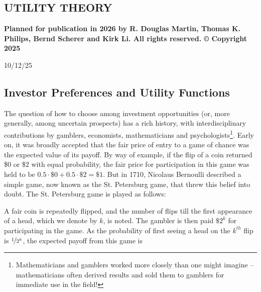 \documentclass[graybox,envcountchap,sectrefs]{svmono}\usepackage[]{graphicx}\usepackage[]{xcolor}
\begin{document}
\begin{appendices}


\setcounter{chapter}{2} 

\chapter{UTILITY THEORY\label{chap:AppendixC}}

\vspace{0.3in}

\textbf{Planned for publication in 2026 by R. Douglas Martin, Thomas
K. Philips, Bernd Scherer and Kirk Li. All rights reserved. © Copyright
2025}

\vspace{0.3in}

\begin{center}
10/12/25
\par\end{center}

\tocchpnum=30pt 
\tocsecnum=33pt 
\tocsubsecnum=40pt 
\tocsubsubsecnum=48pt 
\tocparanum=55pt 
\tocsubparanum=63pt
\calctocindent

\tableofcontents{}\newpage{}

\section{Investor Preferences and Utility Functions \label{sec: investorPreferencesConcaveUtilityFncs}}

The question of how to choose among investment opportunities (or,
more generally, among uncertain prospects) has a rich history, with
interdisciplinary contributions by gamblers, economists, mathematicians
and psychologists\footnote{Mathematicians and gamblers worked more closely than one might imagine
-- mathematicians often derived results and sold them to gamblers
for immediate use in the field!}. Early on, it was broadly accepted that the fair price of entry to
a game of chance was the expected value of its payoff. By way of example,
if the flip of a coin returned \$0 or \$2 with equal probability,
the fair price for participation in this game was held to be $0.5\cdot\$0+0.5\cdot\$2=\$1$.
But in 1710, Nicolaus Bernoulli described a simple game, now known
as the St. Petersburg game, that threw this belief into doubt. The
St. Petersburg game is played as follows: 

A fair coin is repeatedly flipped, and the number of flips till the
first appearance of a head, which we denote by $k$, is noted. The
gambler is then paid $\$2^{k}$ for participating in the game. As
the probability of first seeing a head on the $k^{th}$ flip is $\nicefrac{1}{2^{k}}$,
the expected payoff from this game is


\end{appendices}
\end{document}
